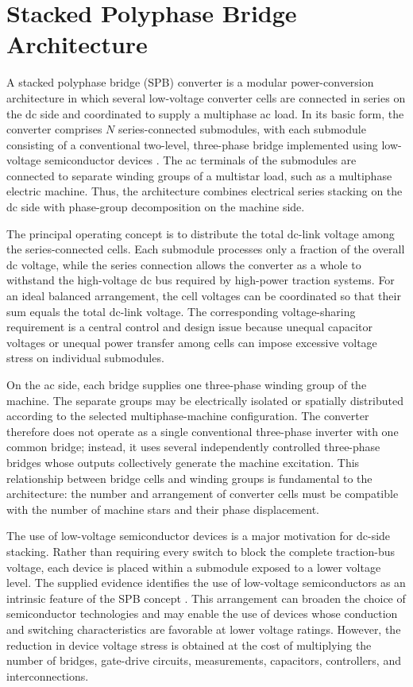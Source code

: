 \section{Stacked Polyphase Bridge Architecture}

A stacked polyphase bridge (SPB) converter is a modular power-conversion architecture in which several low-voltage converter cells are connected in series on the dc side and coordinated to supply a multiphase ac load. In its basic form, the converter comprises \(N\) series-connected submodules, with each submodule consisting of a conventional two-level, three-phase bridge implemented using low-voltage semiconductor devices \cite{Jin2017}. The ac terminals of the submodules are connected to separate winding groups of a multistar load, such as a multiphase electric machine. Thus, the architecture combines electrical series stacking on the dc side with phase-group decomposition on the machine side.

The principal operating concept is to distribute the total dc-link voltage among the series-connected cells. Each submodule processes only a fraction of the overall dc voltage, while the series connection allows the converter as a whole to withstand the high-voltage dc bus required by high-power traction systems. For an ideal balanced arrangement, the cell voltages can be coordinated so that their sum equals the total dc-link voltage. The corresponding voltage-sharing requirement is a central control and design issue because unequal capacitor voltages or unequal power transfer among cells can impose excessive voltage stress on individual submodules. %

On the ac side, each bridge supplies one three-phase winding group of the machine. The separate groups may be electrically isolated or spatially distributed according to the selected multiphase-machine configuration. The converter therefore does not operate as a single conventional three-phase inverter with one common bridge; instead, it uses several independently controlled three-phase bridges whose outputs collectively generate the machine excitation. This relationship between bridge cells and winding groups is fundamental to the architecture: the number and arrangement of converter cells must be compatible with the number of machine stars and their phase displacement. %

The use of low-voltage semiconductor devices is a major motivation for dc-side stacking. Rather than requiring every switch to block the complete traction-bus voltage, each device is placed within a submodule exposed to a lower voltage level. The supplied evidence identifies the use of low-voltage semiconductors as an intrinsic feature of the SPB concept \cite{Jin2017}. This arrangement can broaden the choice of semiconductor technologies and may enable the use of devices whose conduction and switching characteristics are favorable at lower voltage ratings. However, the reduction in device voltage stress is obtained at the cost of multiplying the number of bridges, gate-drive circuits, measurements, capacitors, controllers, and interconnections. %

